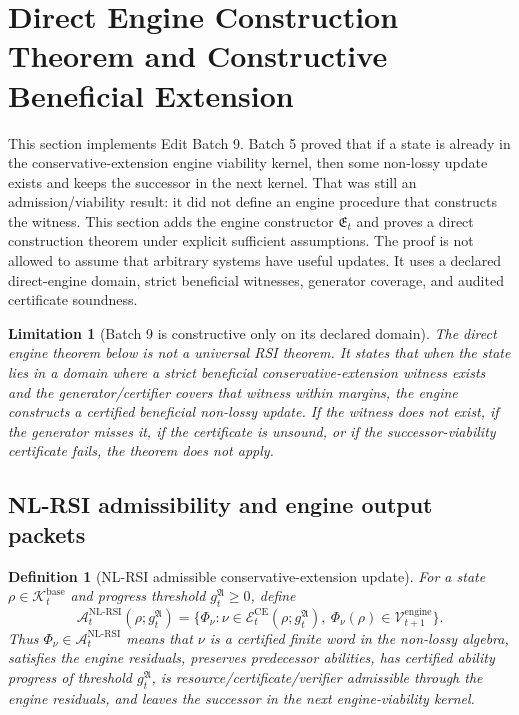 \documentclass[11pt]{article}
\newtheorem{definition}[theorem]{Definition}
\newtheorem{limitation}[theorem]{Limitation}
\newcommand{\Acal}{\mathcal{A}}
\newcommand{\Ecal}{\mathcal{E}}
\newcommand{\1}{\mathbf{1}}
\providecommand{\Kcal}{\mathcal{K}}
\providecommand{\Vcal}{\mathcal{V}}
\begin{document}
\section{Direct Engine Construction Theorem and Constructive Beneficial Extension}
\label{sec:batch9_direct_engine_construction}

This section implements Edit Batch 9.  Batch 5 proved that if a state is already in the conservative-extension engine viability kernel, then some non-lossy update exists and keeps the successor in the next kernel.  That was still an admission/viability result: it did not define an engine procedure that constructs the witness.  This section adds the engine constructor \(\mathfrak E_t\) and proves a direct construction theorem under explicit sufficient assumptions.  The proof is not allowed to assume that arbitrary systems have useful updates.  It uses a declared direct-engine domain, strict beneficial witnesses, generator coverage, and audited certificate soundness.

\begin{limitation}[Batch 9 is constructive only on its declared domain]
The direct engine theorem below is not a universal RSI theorem.  It states that when the state lies in a domain where a strict beneficial conservative-extension witness exists and the generator/certifier covers that witness within margins, the engine constructs a certified beneficial non-lossy update.  If the witness does not exist, if the generator misses it, if the certificate is unsound, or if the successor-viability certificate fails, the theorem does not apply.
\end{limitation}

\subsection{NL-RSI admissibility and engine output packets}

\begin{definition}[NL-RSI admissible conservative-extension update]
\label{def:nl_rsi_admissible_conservative_update}
For a state \(\rho\in\Kcal_t^{\mathrm{base}}\) and progress threshold \(g_t^{\mathfrak A}\ge0\), define
\[
\Acal_t^{\mathrm{NL\mbox{-}RSI}}(\rho;g_t^{\mathfrak A})
=
\{\Phi_\nu:
\nu\in\Ecal_t^{\mathrm{CE}}(\rho;g_t^{\mathfrak A}),\
\Phi_\nu(\rho)\in\Vcal_{t+1}^{\mathrm{engine}}\}.
\]
Thus \(\Phi_\nu\in\Acal_t^{\mathrm{NL\mbox{-}RSI}}\) means that \(\nu\) is a certified finite word in the non-lossy algebra, satisfies the engine residuals, preserves predecessor abilities, has certified ability progress of threshold \(g_t^{\mathfrak A}\), is resource/certificate/verifier admissible through the engine residuals, and leaves the successor in the next engine-viability kernel.
\end{definition}
\end{document}
